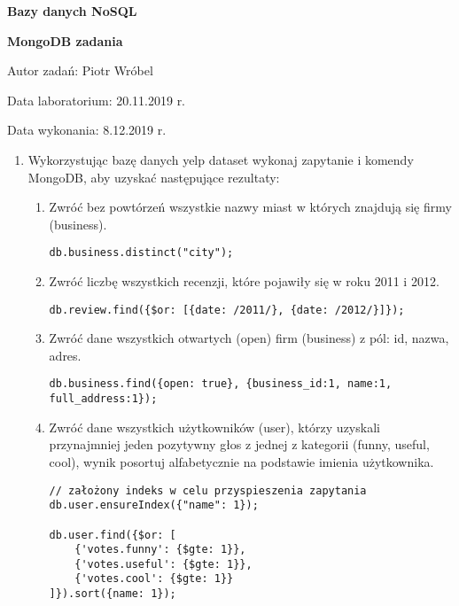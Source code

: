 \documentclass[a4paper,9pt]{extarticle}	%
\begin{document}
\begin{center}

{\LARGE \textbf{Bazy danych \ppauza NoSQL}}


{\Large \textbf{MongoDB \ppauza zadania}}

\end{center}

\begin{flushright}
Autor zadań: Piotr Wróbel

Data laboratorium: 20.11.2019 r.

Data wykonania: 8.12.2019 r.
\end{flushright}

\begin{enumerate}
	\item Wykorzystując bazę danych yelp dataset wykonaj zapytanie i komendy MongoDB, aby uzyskać następujące rezultaty:
	\begin{enumerate}
	  \item Zwróć bez powtórzeń wszystkie nazwy miast w których znajdują się firmy (business).
	  \begin{lstlisting}
db.business.distinct("city");
	  \end{lstlisting}
	  
	  \item Zwróć liczbę wszystkich recenzji, które pojawiły się w roku 2011 i 2012.
	  \begin{lstlisting}
db.review.find({$or: [{date: /2011/}, {date: /2012/}]});
	  \end{lstlisting}
	  
	  \item Zwróć dane wszystkich otwartych (open) firm (business) z pól: id, nazwa, adres.
	  \begin{lstlisting}
db.business.find({open: true}, {business_id:1, name:1, full_address:1});
	  \end{lstlisting}
	  
	  \item Zwróć dane wszystkich użytkowników (user), którzy uzyskali przynajmniej jeden pozytywny głos z jednej z kategorii (funny, useful, cool), wynik posortuj alfabetycznie na podstawie imienia użytkownika.
	  \begin{lstlisting}
// założony indeks w celu przyspieszenia zapytania	  
db.user.ensureIndex({"name": 1});

db.user.find({$or: [
	{'votes.funny': {$gte: 1}}, 
	{'votes.useful': {$gte: 1}}, 
	{'votes.cool': {$gte: 1}}
]}).sort({name: 1});
	  \end{lstlisting}
	  

\end{enumerate}
\end{enumerate}
\end{document}
